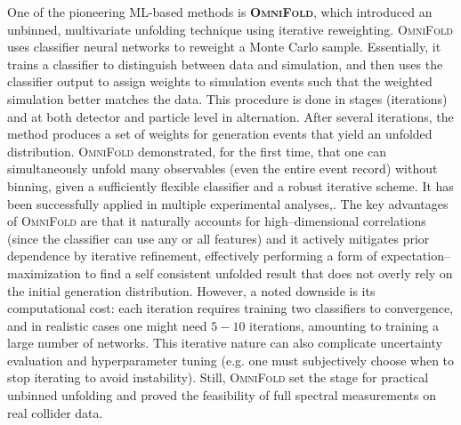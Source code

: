         One of the pioneering ML-based methods is \textbf{\textsc{\textsc{OmniFold}}}, which introduced an unbinned, multivariate unfolding technique using iterative reweighting.
        \textsc{\textsc{OmniFold}} uses classifier neural networks to reweight a Monte Carlo sample.
        Essentially, it trains a classifier to distinguish between data and simulation, and then uses the classifier output to assign weights to simulation events such that the weighted simulation better matches the data.
        This procedure is done in stages (iterations) and at both detector and particle level in alternation.
        After several iterations, the method produces a set of weights for generation events that yield an unfolded distribution.
        \textsc{\textsc{OmniFold}} demonstrated, for the first time, that one can simultaneously unfold many observables (even the entire event record) without binning, given a sufficiently flexible classifier and a robust iterative scheme.\kd{}
        It has been successfully applied in multiple experimental analyses,\kd{}.
        The key advantages of \textsc{\textsc{OmniFold}} are that it naturally accounts for high--dimensional correlations (since the classifier can use any or all features) and it actively mitigates prior dependence by iterative refinement, effectively performing a form of expectation--maximization to find a self consistent unfolded result that does not overly rely on the initial generation distribution.
        However, a noted downside is its computational cost: each iteration requires training two classifiers to convergence, and in realistic cases one might need $5 - 10$ iterations, amounting to training a large number of networks.
        This iterative nature can also complicate uncertainty evaluation and hyperparameter tuning (e.g. one must subjectively choose when to stop iterating to avoid instability).
        Still, \textsc{\textsc{OmniFold}} set the stage for practical unbinned unfolding and proved the feasibility of full spectral measurements on real collider data.

